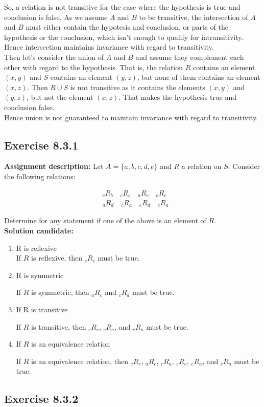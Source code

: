\documentclass{report}
\newcommand{\mAlign}[1]{\begin{align*}#1\end{align*}}
\newcommand{\assignmentDescription}{\textbf{Assignment description: }}
\newcommand{\solution}{\textbf{Solution candidate: }}
\newcommand{\Exercise}[1]{\subsection{Exercise #1}}
\newcommand{\defaultEnumerateLabel}{\textbf{\alph*.}}
\begin{document}
	So, a relation is not transitive for the case where the hypothesis is true and conclusion is false. As we assume $A$ and $B$ to be transitive, the intersection of $A$ and $B$ must either contain the hypotesis and conclusion, or parts of the hypothesis or the conclusion, which isn't enough to qualify for intransitivity.\\
	
	Hence intersection maintains invariance with regard to transitivity.\\
	
	Then let's consider the union of $A$ and $B$ and assume they complement each other with regard to the hypothesis. That is, the relation $R$ contains an element $(x,y)$ and $S$ contains an element $(y,z)$, but none of them contains an element $(x,z)$. Then $R \cup S$ is not transitive as it contains the elements $(x,y)$ and $(y,z)$, but not the element $(x,z)$. That makes the hypothesis true and conclusion false.\\
	
	Hence union is not guaranteed to maintain invariance with regard to transitivity.
	
	\Exercise{8.3.1}
	
	\assignmentDescription
	Let $A=\{a,b,c,d,e\}$ and $R$ a relation on $S$. Consider the following relations:
	
	\mAlign{&_cR_b \quad  _cR_c \quad _aR_c \quad  _bR_c \\
					&_aR_d \quad  _cR_a \quad _e R_d  \quad _cR_a } 
	
	Determine for any statement if one of the above is an element of $R$.\\
	
	\solution
	
	\begin{enumerate}[label=\defaultEnumerateLabel]
		\item R is reflexive\\
		
		If $R$ is reflexive, then $_cR_c$ must be true.
		
		\item R is symmetric
		
		If $R$ is symmetric, then $_aR_c$ and $_cR_a$ must be true.
		
		\item If R is transitive
		
		If $R$ is transitive, then $_cR_c$, $_cR_a$, and $_cR_a$ must be true.
		
		\item If $R$ is an equivalence relation
		
		If $R$ is an equivalence relation, then $_cR_c$, $_aR_c$, $_cR_a$, $_cR_c$, $_cR_a$, and $_cR_a$ must be true.
	\end{enumerate}
	\Exercise{8.3.2}
	
\end{document}
